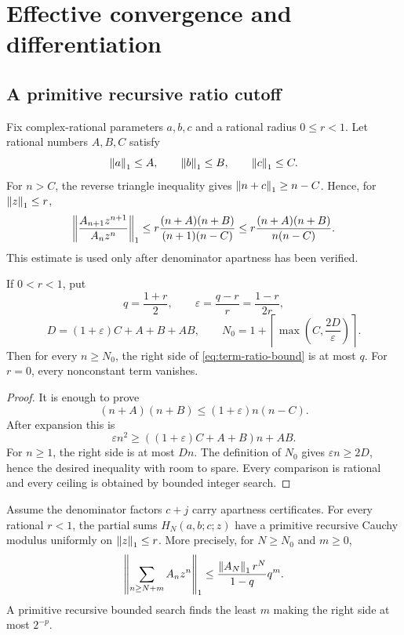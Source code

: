 \section{Effective convergence and differentiation}\label{sec:convergence}

\subsection{A primitive recursive ratio cutoff}

Fix complex-rational parameters \(a,b,c\) and a rational radius
\(0\le r<1\).  Let rational numbers \(A,B,C\) satisfy
\[
 \left\lVert a\right\rVert_1\le A,\qquad \left\lVert b\right\rVert_1\le B,\qquad \left\lVert c\right\rVert_1\le C.
\]
For \(n>C\), the reverse triangle inequality gives
\(\left\lVert n+c\right\rVert_1\ge n-C\).  Hence, for \(\left\lVert z\right\rVert_1\le r\),
\begin{equation}\label{eq:term-ratio-bound}
 \left\lVert\frac{A_{n+1}z^{n+1}}{A_nz^n}\right\rVert_1
 \le r\frac{(n+A)(n+B)}{(n+1)(n-C)}
 \le r\frac{(n+A)(n+B)}{n(n-C)}.
\end{equation}
This estimate is used only after denominator apartness has been verified.

\begin{lemma}\label{lem:ratio-cutoff}
If \(0<r<1\), put
\[
 q=\frac{1+r}{2},\qquad
 \varepsilon=\frac{q-r}{r}=\frac{1-r}{2r},
\]
\[
 D=(1+\varepsilon)C+A+B+AB,
 \qquad
 N_0=1+\left\lceil\max\left(C,\frac{2D}{\varepsilon}\right)\right\rceil.
\]
Then for every \(n\ge N_0\), the right side of
\eqref{eq:term-ratio-bound} is at most \(q\).  For \(r=0\), every nonconstant
term vanishes.
\end{lemma}

\begin{proof}
It is enough to prove
\[
 (n+A)(n+B)\le(1+\varepsilon)n(n-C).
\]
After expansion this is
\[
 \varepsilon n^2\ge
  ((1+\varepsilon)C+A+B)n+AB.
\]
For \(n\ge1\), the right side is at most \(Dn\).  The definition of
\(N_0\) gives \(\varepsilon n\ge2D\), hence the desired inequality with
room to spare.  Every comparison is rational and every ceiling is obtained by
bounded integer search.
\end{proof}

\begin{theorem}\label{thm:disk-convergence}
Assume the denominator factors \(c+j\) carry apartness certificates.  For
every rational \(r<1\), the partial sums
\(H_N(a,b;c;z)\) have a primitive recursive Cauchy modulus uniformly on
\(\left\lVert z\right\rVert_1\le r\).  More precisely, for \(N\ge N_0\) and \(m\ge0\),
\begin{equation}\label{eq:geometric-tail}
 \left\lVert\sum_{n\ge N+m}A_nz^n\right\rVert_1
 \le \frac{\left\lVert A_N\right\rVert_1r^N}{1-q}q^m.
\end{equation}
A primitive recursive bounded search finds the least \(m\) making the right
side at most \(2^{-p}\).
\end{theorem}

